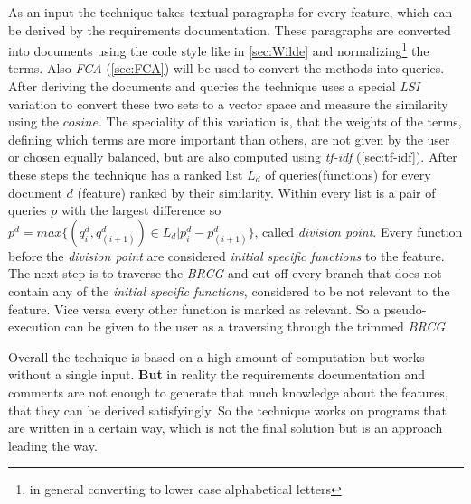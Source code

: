 As an input the technique takes textual paragraphs for every feature, which can be derived by the requirements documentation. These paragraphs are converted into documents using the code style  like in \autoref{sec:Wilde} and normalizing\footnote{in general converting to lower case alphabetical letters} the terms. Also \textit{FCA} (\autoref{sec:FCA}) will be used to convert the methods into queries. \newline
After deriving the documents and queries the technique uses a special \textit{LSI} variation to convert these two sets to a vector space and measure the similarity using the $cosine$. The speciality of this variation is, that the weights of the terms, defining which terms are more important than others, are not given by the user or chosen equally balanced, but are also computed using \textit{tf-idf} (\autoref{sec:tf-idf}).\newline
After these steps the technique has a ranked list $L_d$ of queries(functions) for every document $d$ (feature) ranked by their similarity. Within every list is a pair of queries $p$ with the largest difference so $p^d = max\{ (q^d_i, q^d_{(i+1)}) \in L_d | p^d_i - p^d_{(i+1)} \}$, called \textit{division point}. Every function before the \textit{division point} are considered \textit{initial specific functions} to the feature. \newline
The next step is to traverse the \textit{BRCG} and cut off every branch that does not contain any of the \textit{initial specific functions}, considered to be not relevant to the feature. Vice versa every other function is marked as relevant. So a pseudo-execution can be given to the user as a traversing through the trimmed \textit{BRCG}.\newline

Overall the technique is based on a high amount of computation but works without a single input. \textbf{But} in reality the requirements documentation and comments are not enough to generate that much knowledge about the features, that they can be derived satisfyingly. So the technique works on programs that are written in a certain way, which is not the final solution but is an approach leading the way.




